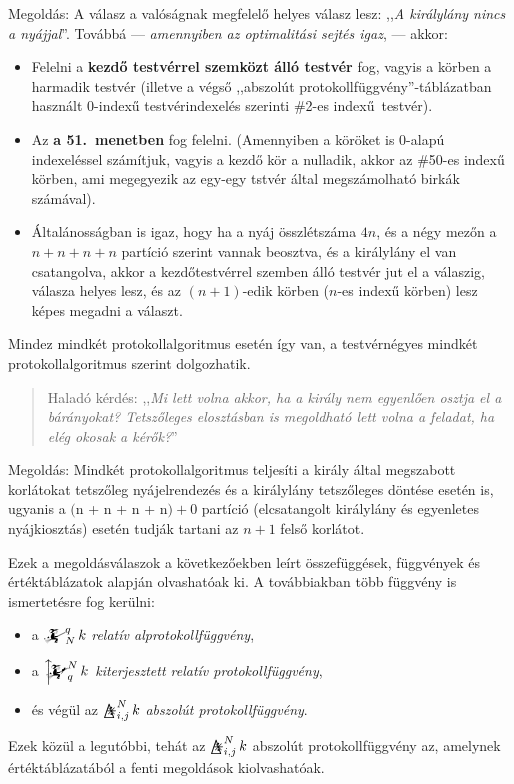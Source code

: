 \documentclass{article}
\newcommand{\eye}{\bigtriangleup\mspace{-14.607mu}\divideontimes}
\newcommand{\eyefun}[4]{\mathop{\eye}^{#1}_{#2,#3}#4}
\newcommand{\mainfun}[3]{\mathwitch_{#1}^{#2}#3}
\newcommand{\mainfunext}[3]{\left\uparrow\!\!\!\mathwitch*_{#2}^{#1}#3\right.}
\begin{document}
	Megoldás: A válasz a valóságnak megfelelő helyes válasz lesz: ,,\textit{A királylány nincs a nyájjal}''.
	Továbbá --- \emph{amennyiben az optimalitási sejtés igaz}, --- akkor:
	\begin{itemize}
		\item Felelni a \textbf{kezdő testvérrel szemközt álló testvér} fog, vagyis a körben a harmadik testvér (illetve a végső ,,abszolút protokollfüggvény''-táblázatban használt 0-indexű testvérindexelés szerinti \#2-es indexű~testvér).
		\item Az \textbf{a 51.~menetben} fog felelni. (Amennyiben a köröket is 0-alapú indexeléssel számítjuk, vagyis a kezdő kör a nulladik, akkor az \#50-es indexű körben, ami megegyezik az egy-egy tstvér által megszámolható birkák számával).
		\item Általánosságban is igaz, hogy ha a nyáj összlétszáma $4n$, és a négy mezőn a $n + n + n + n$ partíció szerint vannak beosztva, és a királylány el van csatangolva, akkor a kezdőtestvérrel szemben álló testvér jut el a válaszig, válasza helyes lesz, és az $(n+1)$-edik körben ($n$-es indexű körben) lesz képes megadni a választ. 
	\end{itemize}

	Mindez mindkét protokollalgoritmus esetén így van, a testvérnégyes mindkét protokollalgoritmus szerint dolgozhatik.
	
	\begin{quotation}
		Haladó kérdés: ,,\textit{Mi lett volna akkor, ha a király nem egyenlően osztja el a bárányokat? Tetszőleges elosztásban is megoldható lett volna a feladat, ha elég okosak a kérők?}''
	\end{quotation}

	Megoldás: Mindkét protokollalgoritmus teljesíti a király által megszabott korlátokat tetszőleg nyájelrendezés és a királylány tetszőleges döntése esetén is, ugyanis a $($n + n + n + n$) + 0$ partíció (elcsatangolt királylány és egyenletes nyájkiosztás) esetén tudják tartani az $n+1$ felső korlátot.

	Ezek a megoldásválaszok a következőekben leírt összefüggések, függvények és értéktáblázatok alapján olvashatóak ki. A továbbiakban több függvény is ismertetésre fog kerülni:
	\begin{itemize}
		\item a $\mainfun Nqk$ \emph{relatív alprotokollfüggvény},
		\item a $\mainfunext Nqk$ \emph{kiterjesztett relatív protokollfüggvény},
		\item és végül az $\eyefun Nijk$ \emph{abszolút protokollfüggvény}.
	\end{itemize}
	Ezek közül a legutóbbi, tehát az  $\eyefun Nijk$ abszolút protokollfüggvény az, amelynek értéktáblázatából a fenti megoldások kiolvashatóak.
\end{document}
